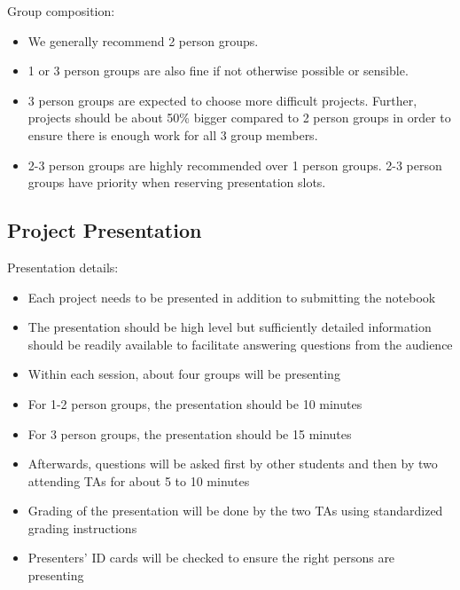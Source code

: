 \documentclass[a4paper,11pt]{article}
\begin{document}
Group composition:
\begin{itemize}
  \item We generally recommend 2 person groups.
  \item 1 or 3 person groups are also fine if not otherwise possible or sensible.
  \item 3 person groups are expected to choose more difficult projects. Further, projects should be about 50\% bigger compared to 2 person groups in order to ensure there is enough work for all 3 group members.
  \item 2-3 person groups are highly recommended over 1 person groups. 2-3 person groups have priority when reserving presentation slots.
\end{itemize}

\subsection*{Project Presentation}

Presentation details:
\begin{itemize}
  \item Each project needs to be presented in addition to submitting the notebook
  \item The presentation should be high level but sufficiently detailed information should be readily available to facilitate answering questions from the audience
  \item Within each session, about four groups will be presenting
  \item For 1-2 person groups, the presentation should be 10 minutes
  \item For 3 person groups, the presentation should be 15 minutes 
  \item Afterwards, questions will be asked first by other students and then by two attending TAs for about 5 to 10 minutes
  \item Grading of the presentation will be done by the two TAs using standardized grading instructions
  \item Presenters' ID cards will be checked to ensure the right persons are presenting
\end{itemize}
\end{document}
